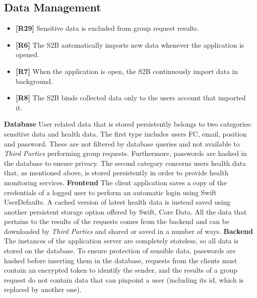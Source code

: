 \documentclass[titlepage]{article}
\begin{document}
	\subsection{Data Management}
	\begin{itemize}
		\item {\bf [R29]} Sensitive data is excluded from group request results. 
		\item {\bf [R6]} The S2B automatically imports new data whenever the application is opened.
		\item {\bf [R7]} When the application is open, the S2B continuously import data in background.
		\item {\bf [R8]} The S2B binds collected data only to the user\textsc{}s account that imported it. 
	\end{itemize}	
	\noindent
	{\bf Database} \newline
	User related data that is stored persistently belongs to two categories: sensitive data and health data. The first type includes user\textsc{}s FC, email, position and password. These are not filtered by database queries and not available to {\it Third Parties} performing group requests. Furthermore, passwords are hashed in the database to ensure privacy. The second category concerns user\textsc{}s health data that, as mentioned above, is stored persistently in order to provide health monitoring services.
	\newline
	\newline
	\noindent
	{\bf Frontend} \newline
	The client application saves a copy of the credentials of a logged user to perform an automatic login using Swift UserDefaults. A cached version of latest health data is instead saved using another persistent storage option offered by Swift, Core Data. All the data that pertains to the results of the requests comes from the backend and can be downloaded by {\it Third Parties} and shared or saved in a number of ways.   
	\newline
	\newline
	\noindent
	{\bf Backend} \newline
	The instances of the application server are completely stateless, so all data is stored on the database. To ensure protection of sensible data, passwords are hashed before inserting them in the database, requests from the clients must contain an encrypted token to identify the sender, and the results of a group request do not contain data that can pinpoint a user (including its id, which is replaced by another one).
	
\end{document}
